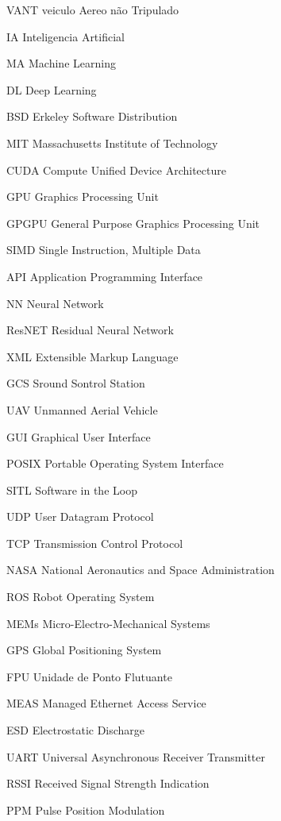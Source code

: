 \documentclass[
	12pt,					%
	openright,				%
	oneside,					%
	a4paper,					%
	english,					%
	brazil					%
	]{abntex2}
\begin{document}
\begin{siglas}
  \item [VANT] veiculo Aereo não Tripulado
  \item [IA] Inteligencia Artificial
  \item [MA] Machine Learning
  \item [DL] Deep Learning
  \item [BSD] Erkeley Software Distribution
  \item [MIT] Massachusetts Institute of Technology
  \item [CUDA] Compute Unified Device Architecture
  \item [GPU] Graphics Processing Unit
  \item [GPGPU] General Purpose Graphics Processing Unit
  \item [SIMD] Single Instruction, Multiple Data
  \item [API] Application Programming Interface
  \item [NN] Neural Network
  \item [ResNET] Residual Neural Network
  \item [XML] Extensible Markup Language
  \item [GCS] Sround Sontrol Station
  \item [UAV] Unmanned Aerial Vehicle
  \item [GUI] Graphical User Interface
  \item [POSIX] Portable Operating System Interface
  \item [SITL] Software in the Loop
  \item [UDP] User Datagram Protocol
  \item [TCP] Transmission Control Protocol
  \item [NASA] National Aeronautics and Space Administration
  \item [ROS] Robot Operating System
  \item [MEMs] Micro-Electro-Mechanical Systems
  \item [GPS] Global Positioning System
  \item [FPU] Unidade de Ponto Flutuante
  \item [MEAS] Managed Ethernet Access Service
  \item [ESD] Electrostatic Discharge
  \item [UART] Universal Asynchronous Receiver Transmitter
  \item [RSSI] Received Signal Strength Indication
  \item [PPM] Pulse Position Modulation

\end{siglas}
\end{document}
